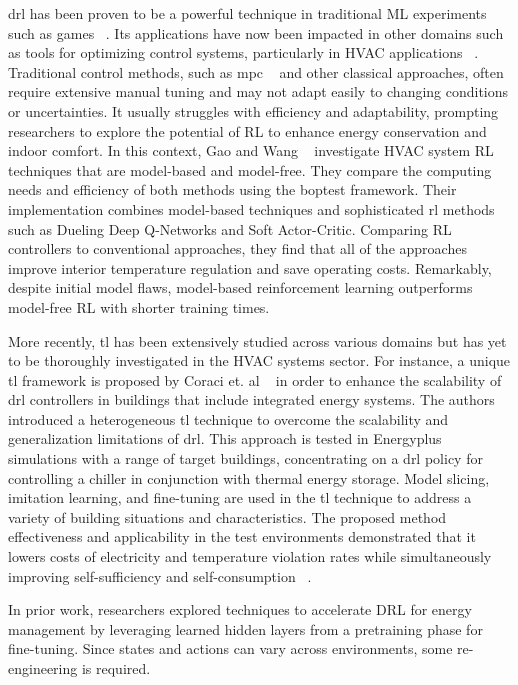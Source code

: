 \documentclass{article}
\begin{document}
\gls{drl} has been proven to be a powerful technique in traditional ML experiments such as games ~\cite{Mnih}. Its applications have now been impacted in other domains such as tools for optimizing control systems, particularly in HVAC applications ~\cite{Sayeda}. Traditional control methods, such as \gls{mpc} ~\cite{Taheri} and other classical approaches, often require extensive manual tuning and may not adapt easily to changing conditions or uncertainties. It usually struggles with efficiency and adaptability, prompting researchers to explore the potential of RL to enhance energy conservation and indoor comfort. In this context,  Gao and Wang ~\cite{Gao} investigate HVAC system RL techniques that are model-based and model-free. They compare the computing needs and efficiency of both methods using the \gls{boptest} framework. Their implementation combines model-based techniques and sophisticated \gls{rl} methods such as Dueling Deep Q-Networks and Soft Actor-Critic. Comparing RL controllers to conventional approaches, they find that all of the approaches improve interior temperature regulation and save operating costs. Remarkably, despite initial model flaws, model-based reinforcement learning outperforms model-free RL with shorter training times. 

More recently, \gls{tl} has been extensively studied across various domains but has yet to be thoroughly investigated in the HVAC systems sector.  For instance, a unique \gls{tl} framework is proposed by Coraci et. al ~\cite{Coraci} in order to enhance the scalability of \gls{drl} controllers in buildings that include integrated energy systems. The authors introduced a heterogeneous \gls{tl} technique to overcome the scalability and generalization limitations of \gls{drl}. This approach is tested in Energyplus simulations with a range of target buildings, concentrating on a \gls{drl} policy for controlling a chiller in conjunction with thermal energy storage. Model slicing, imitation learning, and fine-tuning are used in the \gls{tl} technique to address a variety of building situations and characteristics. The proposed method effectiveness and applicability in the test environments demonstrated that it lowers costs of electricity and temperature violation rates while simultaneously improving self-sufficiency and self-consumption ~\cite{Maier}. 


In prior work, researchers explored techniques to accelerate DRL for energy management by leveraging learned hidden layers from a pretraining phase for fine-tuning. Since states and actions can vary across environments, some re-engineering is required.
\end{document}
